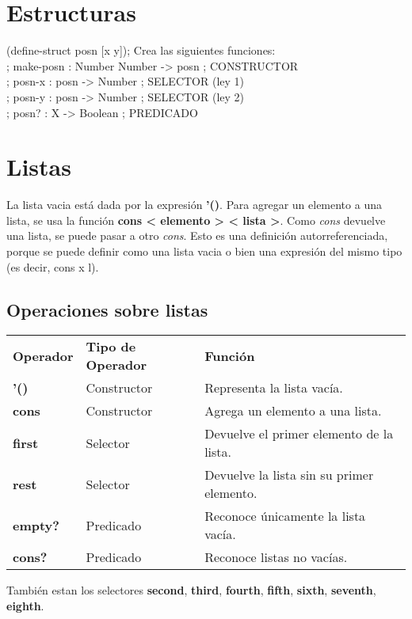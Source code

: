 \documentclass[11pt,a4paper]{article}
\begin{document}
\section{Estructuras}
\begin{siderules}
(define-struct posn [x y]); Crea las siguientes funciones:\\
; make-posn : Number Number -> posn ; CONSTRUCTOR\\
; posn-x : posn -> Number ; SELECTOR (ley 1)\\
; posn-y : posn -> Number ; SELECTOR (ley 2)\\
; posn? : X -> Boolean ; PREDICADO
\end{siderules}

\section{Listas}
La lista vacia est\'a dada por la expresi\'on \textbf{'()}. Para agregar un elemento a una lista, se usa la funci\'on \textbf{cons < elemento > < lista >}. Como \textit{cons} devuelve una lista, se puede pasar a otro \textit{cons}. Esto es una definici\'on autorreferenciada, porque se puede definir como una lista vacia o bien una expresi\'on del mismo tipo (es decir, cons x l).
\newpage
\subsection{Operaciones sobre listas}
\begin{table}[h]
\centering
\begin{tabular}{lll}
\textbf{Operador} & \textbf{Tipo de Operador} & \textbf{Funci\'on}\\
\textbf{'()} & Constructor & Representa la lista vacía. \\
\textbf{cons} & Constructor & Agrega un elemento a una lista. \\
\textbf{first} & Selector & Devuelve el primer elemento de la lista. \\
\textbf{rest} & Selector & Devuelve la lista sin su primer elemento. \\
\textbf{empty?} & Predicado & Reconoce únicamente la lista vacía. \\
\textbf{cons?} & Predicado & Reconoce listas no vacías.
\end{tabular}
\end{table}
\noindent Tambi\'en estan los selectores \textbf{second}, \textbf{third}, \textbf{fourth}, \textbf{fifth}, \textbf{sixth}, \textbf{seventh}, \textbf{eighth}.
\end{document}
